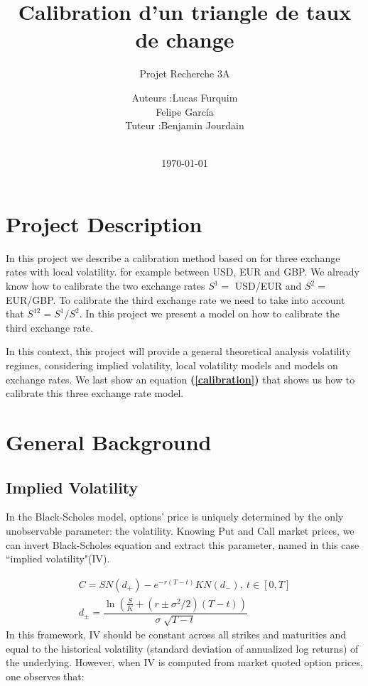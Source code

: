 \documentclass[a4paper, 12pt]{article}
\title{Calibration d’un triangle de taux de change}
\subtitle{Projet Recherche 3A}
\author{
\begin{tabular}{ll}
\\
Auteurs : & Lucas Furquim \\
		& Felipe Garc\'ia \\
Tuteur : & Benjamin Jourdain
\end{tabular}
\\}
\date\today
\numberwithin{equation}{subsection}
\begin{document}
    \maketitle
    \renewcommand{\baselinestretch}{1.1}
    \setlength{\parskip}{0.5em}
	

\pagebreak

\tableofcontents

\clearpage

\section{Project Description}

In this project we describe a calibration method based on \cite{guyon2013new} for three exchange rates with local volatility. for example between USD, EUR and GBP. We already know how to calibrate the two exchange rates $S^1 = $ USD/EUR and $S^2 = $ EUR/GBP. To calibrate the third exchange rate we need to take into account that $S^{12} = S^1 / S^2$. In this project we present a  model on how to calibrate the third exchange rate.

In this context, this project will provide a general theoretical analysis volatility regimes, considering implied volatility, local volatility models and models on exchange rates. We last show an equation \textbf{(\ref{calibration})} that shows us how to calibrate this three exchange rate model.

\section{General Background}

\subsection{Implied Volatility}
In the Black-Scholes model, options' price is uniquely determined by the only
unobservable parameter: the volatility. Knowing Put and Call market prices,
we can invert Black-Scholes equation and extract this parameter, named in this
case ``implied volatility"(IV).

\begin{align}
C = SN(d_{+}) - e^{-r(T-t)}KN(d_{-}),\: t \in [0, T] \\
d_{\pm} = \dfrac{\ln(\frac{S}{K} + (r \pm \sigma^2 / 2)(T-t))}{\sigma \sqrt[]{T-t}}\label{BS}
\end{align} 
In this framework, IV should be constant across all
strikes and maturities and equal to the historical volatility (standard deviation
of annualized log returns) of the underlying. However, when IV is computed
from market quoted option prices, one observes that:
 
\end{document}
